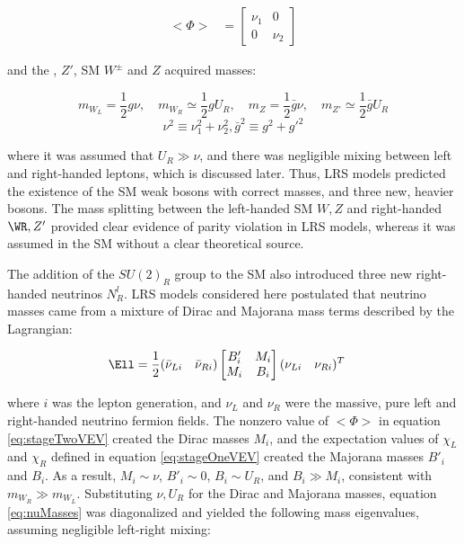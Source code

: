 \begin{align}
	<\Phi> &= \begin{bmatrix}
	\nu_{1} & 0 \\
	0 & \nu_{2}
	\end{bmatrix}
	\label{eq:stageTwoVEV}
\end{align}

and the \WR, $Z'$, SM $W^{\pm}$ and $Z$ acquired masses:

\begin{equation}
	m_{W_{L}} = \frac{1}{2}g\nu ,\quad m_{W_{R}} \simeq \frac{1}{2}gU_{R} ,\quad m_{Z} = \frac{1}{2}\bar{g}\nu ,\quad m_{Z'} \simeq \frac{1}{2}\bar{g}U_{R}
\end{equation}
\begin{equation}
	\nu^{2} \equiv \nu^{2}_{1} + \nu^{2}_{2} , \bar{g}^{2} \equiv g^{2} + g'^{2}
\end{equation}

where it was assumed that $U_{R} \gg \nu$, and there was negligible mixing between left and right-handed leptons, 
which is discussed later.  Thus, LRS models predicted the existence of the SM weak bosons with correct masses, and three new, 
heavier bosons.  The mass splitting between the left-handed SM $W,Z$ and right-handed $\WR,Z'$ provided clear evidence of 
parity violation in LRS models, whereas it was assumed in the SM without a clear theoretical source.

The addition of the $SU(2)_{R}$ group to the SM also introduced three new right-handed neutrinos $N^{l}_{R}$.  
LRS models considered here postulated that neutrino masses came from a mixture of Dirac and Majorana mass 
terms \cite{seeSawAndParityViolation,seeSawAndGUTs} described by the Lagrangian:

\begin{align}
	\Ell &= \frac{1}{2}(\bar{\nu}_{Li} \quad \bar{\nu}_{Ri})\begin{bmatrix}
	B'_{i} & M_{i} \\
	M_{i} & B_{i}
\end{bmatrix}(\nu_{Li} \quad \nu_{Ri})^{T}
\label{eq:nuMasses}
\end{align}

where $i$ was the lepton generation, and $\nu_{L}$ and $\nu_{R}$ were the massive, pure left and right-handed 
neutrino fermion fields.  The nonzero value of $<\Phi>$ in equation \ref{eq:stageTwoVEV} created the 
Dirac masses $M_{i}$, and the expectation values of $\chi_{L}$ and $\chi_{R}$ defined in equation \ref{eq:stageOneVEV} 
created the Majorana masses $B'_{i}$ and $B_{i}$.  As a result, $M_{i} \sim \nu$, $B'_{i} \sim 0$, 
$B_{i} \sim U_{R}$, and $B_{i} \gg M_{i}$, consistent with $m_{W_{R}} \gg m_{W_{L}}$.  Substituting 
$\nu,U_{R}$ for the Dirac and Majorana masses, equation \ref{eq:nuMasses} was diagonalized and 
yielded the following mass eigenvalues, assuming negligible left-right mixing:

